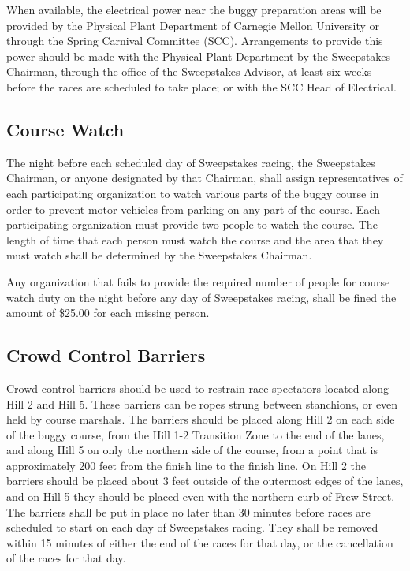 	When available, the electrical power near the buggy preparation areas will be provided by the Physical Plant Department of Carnegie Mellon University or through the Spring Carnival Committee (SCC). Arrangements to provide this power should be made with the Physical Plant Department by the Sweepstakes Chairman, through the office of the Sweepstakes Advisor, at least six weeks before the races are scheduled to take place; or with the SCC Head of Electrical. 

\subsection{Course Watch}
\label{subsec:Course Watch}

	The night before each scheduled day of Sweepstakes racing, the Sweepstakes Chairman, or anyone designated by that Chairman, shall assign representatives of each participating organization to watch various parts of the buggy course in order to prevent motor vehicles from parking on any part of the course. Each participating organization must provide two people to watch the course. The length of time that each person must watch the course and the area that they must watch shall be determined by the Sweepstakes Chairman.

	Any organization that fails to provide the required number of people for course watch duty on the night before any day of Sweepstakes racing, shall be fined the amount of \$25.00 for each missing person.

\subsection{Crowd Control Barriers}
\label{subsec:Crowd Control}

	Crowd control barriers should be used to restrain race spectators located along Hill 2 and Hill 5. These barriers can be ropes strung between stanchions, or even held by course marshals. The barriers should be placed along Hill 2 on each side of the buggy course, from the Hill 1-2 Transition Zone to the end of the lanes, and along Hill 5 on only the northern side of the course, from a point that is approximately 200 feet from the finish line to the finish line. On Hill 2 the barriers should be placed about 3 feet outside of the outermost edges of the lanes, and on Hill 5 they should be placed even with the northern curb of Frew Street. The barriers shall be put in place no later than 30 minutes before races are scheduled to start on each day of Sweepstakes racing. They shall be removed within 15 minutes of either the end of the races for that day, or the cancellation of the races for that day.

